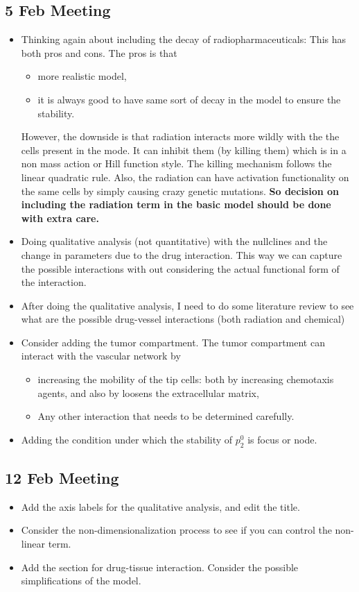\subsection{5 Feb Meeting}
\begin{itemize}[itemsep=0pt, parsep=0pt]
	\item Thinking again about including the decay of radiopharmaceuticals: This has both pros and cons. The pros is that 
	\begin{itemize}[itemsep=0pt, parsep=0pt]
		\item more realistic model,
		\item it is always good to have same sort of decay in the model to ensure the stability.
	\end{itemize}
	However, the downside is that radiation interacts more wildly with the the cells present in the mode. It can inhibit them (by killing them) which is in a non mass action or Hill function style. The killing mechanism follows the linear quadratic rule. Also, the radiation can have activation functionality on the same cells by simply causing crazy genetic mutations. \textbf{So decision on including the radiation term in the basic model should be done with extra care.}
	\item Doing qualitative analysis (not quantitative) with the nullclines and the change in parameters due to the drug interaction. This way we can capture the possible interactions with out considering the actual functional form of the interaction.
	\item After doing the qualitative analysis, I need to do some literature review to see what are the possible drug-vessel interactions (both radiation and chemical)
	\item Consider adding the tumor compartment. The tumor compartment can interact with the vascular network by
	\begin{itemize}[itemsep=0pt, parsep=0pt]
		\item increasing the mobility of the tip cells: both by increasing chemotaxis agents, and also by loosens the extracellular matrix,
		\item Any other interaction that needs to be determined carefully.
	\end{itemize}
	\item Adding the condition under which the stability of $p^0_2$ is focus or node.
\end{itemize}


\subsection{12 Feb Meeting}
\begin{itemize}
	\item Add the axis labels for the qualitative analysis, and edit the title.
	\item Consider the non-dimensionalization process to see if you can control the non-linear term.
	\item Add the section for drug-tissue interaction. Consider the possible simplifications of the model.
\end{itemize}

